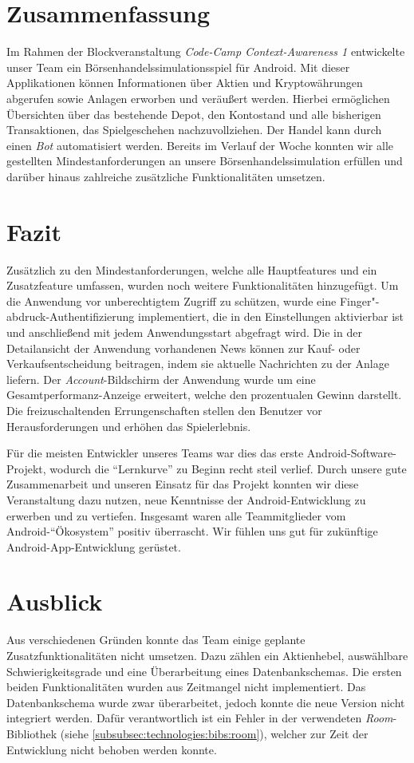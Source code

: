 \documentclass[a4paper]{article}
\begin{document}
\section{Zusammenfassung}
\label{sec:summary}
Im Rahmen der Blockveranstaltung \textit{Code-Camp Context-Awareness 1} entwickelte unser Team ein Börsenhandelssimulationsspiel für Android.
Mit dieser Applikationen können Informationen über Aktien und Kryptowährungen abgerufen sowie Anlagen erworben und veräußert werden.
Hierbei ermöglichen Übersichten über das bestehende Depot, den Kontostand und alle bisherigen Transaktionen, das Spielgeschehen nachzuvollziehen.
Der Handel kann durch einen \textit{Bot} automatisiert werden. \newline
Bereits im Verlauf der Woche konnten wir alle gestellten Mindestanforderungen an unsere Börsenhandelssimulation erfüllen und darüber hinaus zahlreiche zusätzliche Funktionalitäten umsetzen.


\section{Fazit}
\label{sec:conclusion}
Zusätzlich zu den Mindestanforderungen, welche alle Hauptfeatures und ein Zusatzfeature umfassen, wurden noch weitere Funktionalitäten hinzugefügt.
Um die Anwendung vor unberechtigtem Zugriff zu schützen, wurde eine Finger"-abdruck-Authentifizierung implementiert, die in den Einstellungen aktivierbar ist und anschließend mit jedem Anwendungsstart abgefragt wird.
Die in der Detailansicht der Anwendung vorhandenen News können zur Kauf- oder Verkaufsentscheidung beitragen, indem sie aktuelle Nachrichten zu der Anlage liefern.
Der \textit{Account}-Bildschirm der Anwendung wurde um eine Gesamtperformanz-Anzeige erweitert, welche den prozentualen Gewinn darstellt.
Die freizuschaltenden Errungenschaften stellen den Benutzer vor Herausforderungen und erhöhen das Spielerlebnis.

Für die meisten Entwickler unseres Teams war dies das erste Android-Software-Projekt, wodurch die "`Lernkurve"' zu Beginn recht steil verlief.
Durch unsere gute Zusammenarbeit und unseren Einsatz für das Projekt konnten wir diese Veranstaltung dazu nutzen, neue Kenntnisse der Android-Entwicklung zu erwerben und zu vertiefen.
Insgesamt waren alle Teammitglieder vom Android-"`Ökosystem"' positiv überrascht.
Wir fühlen uns gut für zukünftige Android-App-Entwicklung gerüstet.


\section{Ausblick}
\label{sec:outlook}
Aus verschiedenen Gründen konnte das Team einige geplante Zusatzfunktionalitäten nicht umsetzen.
Dazu zählen ein Aktienhebel, auswählbare Schwierigkeitsgrade und eine Überarbeitung eines Datenbankschemas.
Die ersten beiden Funktionalitäten wurden aus Zeitmangel nicht implementiert.
Das Datenbankschema wurde zwar überarbeitet, jedoch konnte die neue Version nicht integriert werden.
Dafür verantwortlich ist ein Fehler in der verwendeten \textit{Room}-Bibliothek (siehe \autoref{subsubsec:technologies:bibs:room}), welcher zur Zeit der Entwicklung nicht behoben werden konnte.

\begingroup
\raggedright
\printbibliography[title={Referenzen}]
\endgroup
\end{document}
